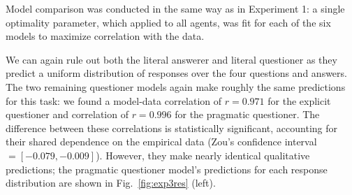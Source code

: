 \documentclass[12pt, floatsintext, man]{apa6}
\begin{document}
Model comparison was conducted in the same way as in Experiment 1: a single optimality parameter, which applied to all agents, was fit for each of the six models to maximize correlation with the data.

We can again rule out both the literal answerer and literal questioner as they predict a uniform distribution of responses over the four questions and answers. The two remaining questioner models again make roughly the same predictions for this task:
we found a model-data correlation of $r = 0.971$ for the explicit questioner and correlation of $r = 0.996$ for the pragmatic questioner. The difference between these correlations is statistically significant, accounting for their shared dependence on the empirical data (Zou's confidence interval $= [-0.079, -0.009]$). However, they make nearly identical qualitative predictions; the pragmatic questioner model's predictions for each response distribution are shown in Fig.~\ref{fig:exp3res} (left). 
\end{document}
